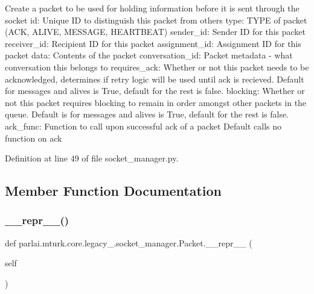 \begin{DoxyVerb}Create a packet to be used for holding information before it is
sent through the socket
id:               Unique ID to distinguish this packet from others
type:             TYPE of packet (ACK, ALIVE, MESSAGE, HEARTBEAT)
sender_id:        Sender ID for this packet
receiver_id:      Recipient ID for this packet
assignment_id:    Assignment ID for this packet
data:             Contents of the packet
conversation_id:  Packet metadata - what conversation this belongs to
requires_ack:     Whether or not this packet needs to be acknowledged,
           determines if retry logic will be used until ack is
           recieved. Default for messages and alives is True,
           default for the rest is false.
blocking:         Whether or not this packet requires blocking to
           remain in order amongst other packets in the queue.
           Default is for messages and alives is True, default
           for the rest is false.
ack_func:         Function to call upon successful ack of a packet
           Default calls no function on ack
\end{DoxyVerb}
 

Definition at line 49 of file socket\+\_\+manager.\+py.



\subsection{Member Function Documentation}
\mbox{\label{classparlai_1_1mturk_1_1core_1_1legacy__2018_1_1socket__manager_1_1Packet_ab584329eae3598c36a1ae14a58be7e72}} 
\subsubsection{\texorpdfstring{\+\_\+\+\_\+repr\+\_\+\+\_\+()}{\_\_repr\_\_()}}
{\footnotesize\ttfamily def parlai.\+mturk.\+core.\+legacy\+\_.\+socket\+\_\+manager.\+Packet.\+\_\+\+\_\+repr\+\_\+\+\_\+ (\begin{DoxyParamCaption}\item[{}]{self }\end{DoxyParamCaption})}



